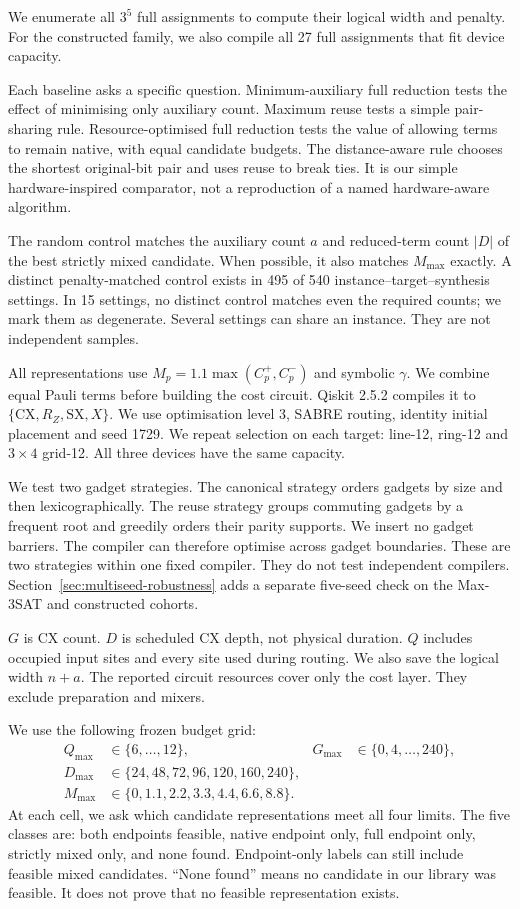 \documentclass[a4paper,onecolumn,11pt,unpublished]{quantumarticle}
\theoremstyle{remark}
\begin{document}
We enumerate all $3^5$ full assignments to compute their logical width and
penalty. For the constructed family, we also compile all 27 full assignments
that fit device capacity.

Each baseline asks a specific question. Minimum-auxiliary full reduction
tests the effect of minimising only auxiliary count. Maximum reuse tests
a simple pair-sharing rule. Resource-optimised full reduction tests the
value of allowing terms to remain native, with equal candidate budgets.
The distance-aware rule chooses the shortest original-bit pair and uses
reuse to break ties. It is our simple hardware-inspired comparator,
not a reproduction of a named hardware-aware algorithm.

The random control matches the auxiliary count $a$ and reduced-term count
$|D|$ of the best strictly mixed candidate. When possible, it also matches
$M_{\max}$ exactly. A distinct penalty-matched control exists in 495 of
540 instance--target--synthesis settings. In 15 settings, no distinct
control matches even the required counts; we mark them as degenerate.
Several settings can share an instance. They are not independent samples.

All representations use $M_p=1.1\max(C_p^+,C_p^-)$ and symbolic $\gamma$.
We combine equal Pauli terms before building the cost circuit.
Qiskit 2.5.2 compiles it to $\{\mathrm{CX},R_Z,\mathrm{SX},X\}$.
We use optimisation level 3, SABRE routing, identity initial placement and
seed 1729. We repeat selection on each target: line-12, ring-12 and
$3\times4$ grid-12. All three devices have the same capacity.

We test two gadget strategies. The canonical strategy orders gadgets by
size and then lexicographically. The reuse strategy groups commuting
gadgets by a frequent root and greedily orders their parity supports.
We insert no gadget barriers. The compiler can therefore optimise across
gadget boundaries. These are two strategies within one fixed compiler.
They do not test independent compilers. Section~\ref{sec:multiseed-robustness}
adds a separate five-seed check on the Max-3SAT and constructed cohorts.

$G$ is CX count. $D$ is scheduled CX depth, not physical duration.
$Q$ includes occupied input sites and every site used during routing.
We also save the logical width $n+a$. The reported circuit resources
cover only the cost layer. They exclude preparation and mixers.

We use the following frozen budget grid:
\[
\begin{aligned}
Q_{\max}&\in\{6,\ldots,12\}, & G_{\max}&\in\{0,4,\ldots,240\},\\
D_{\max}&\in\{24,48,72,96,120,160,240\},\\
M_{\max}&\in\{0,1.1,2.2,3.3,4.4,6.6,8.8\}.
\end{aligned}
\]
At each cell, we ask which candidate representations meet all four limits.
The five classes are: both endpoints feasible, native endpoint only,
full endpoint only, strictly mixed only, and none found.
Endpoint-only labels can still include feasible mixed candidates.
``None found'' means no candidate in our library was feasible.
It does not prove that no feasible representation exists.
\end{document}
